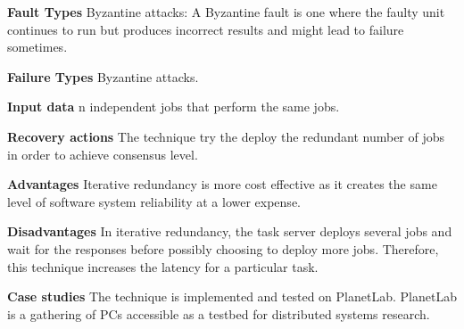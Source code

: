 \begin{compactitem}
\item[\textbf{Fault Types}]Byzantine attacks: A Byzantine fault is one where the faulty unit continues to run but produces incorrect results and might lead to failure sometimes.

\item[\textbf{Failure Types}]Byzantine attacks.

\item[\textbf{Input data}] n independent jobs that perform the same jobs.

\item[\textbf{Recovery actions}]The technique try the deploy the redundant number of jobs in order to achieve consensus level.

\item[\textbf{Advantages}] Iterative redundancy is more cost effective as it creates the same level of software system reliability at a lower expense.

\item[\textbf{Disadvantages}] In iterative redundancy, the task server deploys several jobs and wait for the responses before possibly choosing to deploy more jobs. Therefore, this technique increases the latency for a particular task.

\item[\textbf{Case studies}]
The technique is implemented and tested on PlanetLab. PlanetLab is a gathering of PCs accessible as a testbed for distributed systems research.\\
\end{compactitem}


